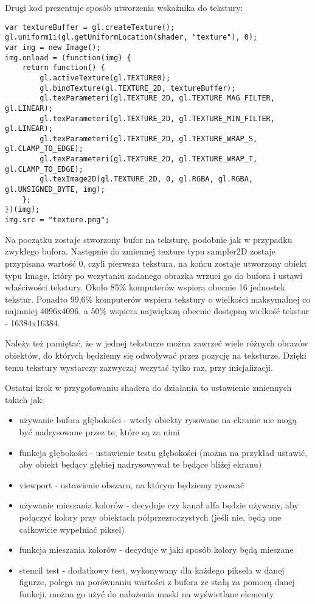 \noindent Drugi kod prezentuje sposób utworzenia wskaźnika do tekstury:
\begin{lstlisting}
var textureBuffer = gl.createTexture();
gl.uniform1i(gl.getUniformLocation(shader, "texture"), 0);
var img = new Image();
img.onload = (function(img) {
	return function() {
		gl.activeTexture(gl.TEXTURE0);
		gl.bindTexture(gl.TEXTURE_2D, textureBuffer);
		gl.texParameteri(gl.TEXTURE_2D, gl.TEXTURE_MAG_FILTER, gl.LINEAR);
		gl.texParameteri(gl.TEXTURE_2D, gl.TEXTURE_MIN_FILTER, gl.LINEAR);
		gl.texParameteri(gl.TEXTURE_2D, gl.TEXTURE_WRAP_S, gl.CLAMP_TO_EDGE);
		gl.texParameteri(gl.TEXTURE_2D, gl.TEXTURE_WRAP_T, gl.CLAMP_TO_EDGE);
		gl.texImage2D(gl.TEXTURE_2D, 0, gl.RGBA, gl.RGBA, gl.UNSIGNED_BYTE, img);
	};
})(img);
img.src = "texture.png";
\end{lstlisting}

Na początku zostaje stworzony bufor na teksturę, podobnie jak w przypadku zwykłego bufora. Następnie do zmiennej texture typu sampler2D zostaje przypisana warto\'sć 0, czyli pierwsza tekstura. na końcu zostaje utworzony obiekt typu Image, który po wczytaniu zadanego obrazka wrzuci go do bufora i ustawi wła\'sciwo\'sci tekstury. Około 85\% komputerów wspiera obecnie 16 jednostek tekstur. Ponadto 99,6\% komputerów wspiera tekstury o wielko\'sci maksymalnej co najmniej 4096x4096, a 50\% wspiera największą obecnie dostępną wielko\'sć tekstur - 16384x16384.

Należy też pamiętać, że w jednej teksturze można zawrzeć wiele różnych obrazów obiektów, do których będziemy się odwoływać przez pozycję na teksturze. Dzięki temu tekstury wystarczy zazwyczaj wczytać tylko raz, przy inicjalizacji.\newpage

\noindent Ostatni krok w przygotowaniu shadera do działania to ustawienie zmiennych takich jak:\begin{itemize}[topsep=0.2em, itemsep=0.5em, partopsep=0em, parsep=0em]
	\item używanie bufora głęboko\'sci - wtedy obiekty rysowane na ekranie nie mogą być nadrysowane przez te, które są za nimi
	\item funkcja głęboko\'sci - ustawienie testu głęboko\'sci (można na przykład ustawić, aby obiekt będący głębiej nadrysowywał te będące bliżej ekranu)
	\item viewport - ustawienie obszaru, na którym będziemy rysować
	\item używanie mieszania kolorów - decyduje czy kanał alfa będzie używany, aby połączyć kolory przy obiektach półprzezroczystych (je\'sli nie, będą one całkowicie wypełniać piksel)
	\item funkcja mieszania kolorów - decyduje w jaki sposób kolory będą mieszane
	\item stencil test - dodatkowy test, wykonywany dla każdego piksela w danej figurze, polega na porównaniu warto\'sci z bufora ze stałą za pomocą danej funkcji, można go użyć do nałożenia maski na wy\'swietlane elementy
\end{itemize}

